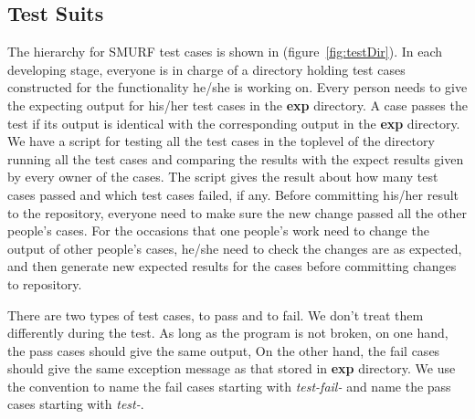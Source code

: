 \subsection{Test Suits}

The hierarchy for SMURF test cases is shown in (figure~\ref{fig:testDir}). 
In each developing stage, everyone is in charge of a directory holding test cases constructed for the functionality he/she is working on. 
Every person needs to give the expecting output for his/her test cases in the {\bf exp} directory.
A case passes the test if its output is identical with the corresponding output in the {\bf exp} directory.
We have a script for testing all the test cases in the toplevel of the directory running all the test cases and comparing the results with the expect results given by every owner of the cases. 
The script gives the result about how many test cases passed and which test cases failed, if any. 
Before committing his/her result to the repository, everyone need to make sure the new change passed all the other people's cases. 
For the occasions that one people's work need to change the output of other people's cases, 
he/she need to check the changes are as expected, 
and then generate new expected results for the cases before committing changes to repository.

There are two types of test cases, to pass and to fail. We don't treat them differently during the test.
As long as the program is not broken, on one hand, the pass cases should give the same output, 
On the other hand, the fail cases should give the same exception message as that stored in {\bf exp} directory.
We use the convention to name the fail cases starting with {\it test-fail-} and name the pass cases starting with {\it test-}.

